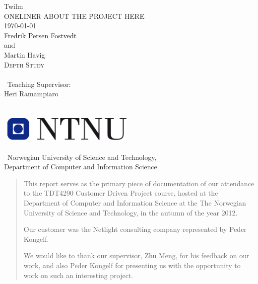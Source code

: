 \documentclass[10pt,a4paper,oneside]{report}
\begin{document}
\thispagestyle{empty}
\begin{center}
	{\Huge Twilm} \\
	\medskip
	{\LARGE ONELINER ABOUT THE PROJECT HERE} \\
    {\large \today \\Fredrik Persen Fostvedt \\ and \\ Martin Havig}
    {\Large \\\textsc{Depth Study}}
    {\large \\\ \\\ Teaching Supervisor: \\ Heri Ramampiaro} \\\ \\\ \\\
    \includegraphics[width=2.5in]{image/logo_NTNU.png} \\\ \\\
    {\Large Norwegian University of Science and Technology, \\
    Department of Computer and Information Science} \\
\end{center}
\newpage

\renewcommand{\abstractname}{Acknowledgments}
\begin{abstract}

This report serves as the primary piece of documentation of our attendance to the TDT4290 Customer Driven Project course, hosted at the Department of Computer and Information Science at the The Norwegian University of Science and Technology, in the autumn of the year 2012.

Our customer was the Netlight consulting company represented by Peder Kongelf.

We would like to thank our supervisor, Zhu Meng, for his feedback on our work, and also Peder Kongelf for presenting us with the opportunity to work on such an interesting project.

\end{abstract}
\end{document}
